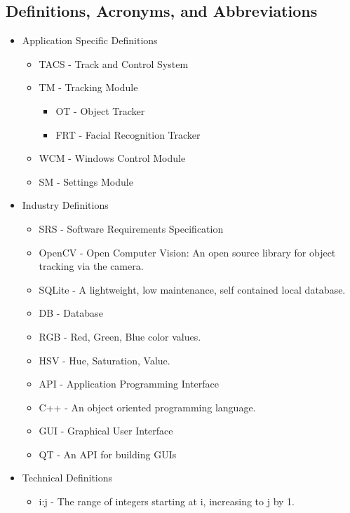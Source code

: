 \documentclass[titlepage]{article}
\begin{document}
\subsection{Definitions, Acronyms, and Abbreviations}
\begin{itemize}
	\item Application Specific Definitions
	\begin{itemize}
		\item TACS - Track and Control System
		\item TM - Tracking Module
		\begin{itemize}
			\item OT - Object Tracker
			\item FRT - Facial Recognition Tracker
		\end{itemize}
		\item WCM - Windows Control Module
		\item SM - Settings Module
	\end{itemize}
	\item Industry Definitions
	\begin{itemize}
		\item SRS - Software Requirements Specification
		\item OpenCV - Open Computer Vision: An open source library for object tracking via the camera.
		\item SQLite - A lightweight, low maintenance, self contained local database.
		\item DB - Database
		\item RGB - Red, Green, Blue color values.
		\item HSV - Hue, Saturation, Value.
		\item API - Application Programming Interface
		\item C++ - An object oriented programming language.
		\item GUI - Graphical User Interface
		\item QT - An API for building GUIs
	\end{itemize}
	\item Technical Definitions
	\begin{itemize}
		\item i:j - The range of integers starting at i, increasing to j by 1.
	\end{itemize}
\end{itemize}
\end{document}

